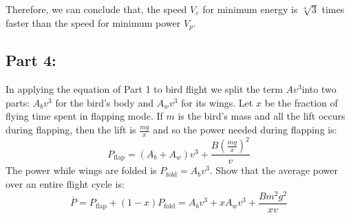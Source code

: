 \documentclass{article}
\begin{document}
Therefore, we can conclude that, the speed \(V_e\) for minimum energy is \(\sqrt[4]{3}\) times faster than the speed for minimum power \(V_p\).

\subsection*{Part 4:}
In applying the equation of Part 1 to bird flight we split the term \(Av^3\)into two
parts: \(A_bv^3\) for the bird’s body and \(A_wv^3\) for its wings. Let \(x\) be the fraction of flying time spent in flapping mode. If \(m\) is the bird’s mass and all the lift occurs during flapping, then the lift is \(\frac{mg}{x}\) and so the power needed during flapping is:
\[P_\text{flap} = (A_b+A_w)v^3+\frac{B(\frac{mg}{x})^2}{v}\]
The power while wings are folded is \(P_\text{fold}=A_bv^3\). Show that the average power over an entire flight cycle is:
\[\overline{P}=P_\text{flap}+(1-x)P_\text{fold} = A_bv^3+xA_wv^3+\frac{Bm^2g^2}{xv}\]
\end{document}
